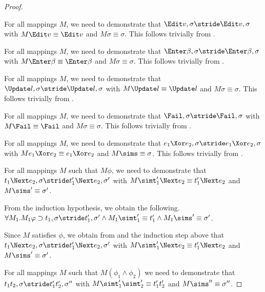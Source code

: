 \begin{proof}
{    }

  {For all mappings $M$, we need to demonstrate that
  $\Edit v,\sigma\stride \Edit v,\sigma$ with $M\Edit v \equiv \Edit v$ and $M\sigma \equiv \sigma$.
  This follows trivially from .

  }

  {For all mappings $M$, we need to demonstrate that $\Enter\beta,\sigma\stride\Enter\beta,\sigma$ with
  $M\Enter \beta \equiv \Enter \beta$ and $M\sigma \equiv {\sigma}$.
  This follows trivially from .
  }

  {For all mappings $M$, we need to demonstrate that $\Update l,\sigma\stride\Update l,\sigma$ with
  $M\Update l \equiv \Update l$ and $M\sigma \equiv {\sigma}$.
  This follows trivially from .
  }

  {For all mappings $M$, we need to demonstrate that $\Fail,\sigma\stride\Fail,\sigma$
  with
  $M\Fail \equiv \Fail$ and $M\sigma \equiv {\sigma}$.
  This follows trivially from .
  }

  {For all mappings $M$, we need to demonstrate that $e_1\Xor e_2,\sigma\stride e_1\Xor e_2,\sigma$ with
  $M e_1\Xor e_2 \equiv e_1\Xor e_2$ and $M\sims \equiv {\sigma}$.
  This follows trivially from .
  }

  {For all mappings $M$ such that $M\phi$,
  we need to demonstrate that
  $t_1\Next e_2,\sigma\stride t_1'\Next e_2,\sigma'$ with
  $M \simt_1'\Next e_2\equiv {t_1'}\Next e_2$ and $M \sims'\equiv{\sigma'}$.

  From the induction hypothesis, we obtain the following.
  $\forall M_1 . M_1 \phi \implies t_1,\sigma {\stride} {t_1'},{\sigma'}\land M_1 \simt_1'\equiv{t_1'}\land M_1\sims' \equiv{\sigma'}$.

  Since $M$ satisfies $\phi$, we obtain from  and the induction step above that $t_1\Next e_2,\sigma\stride t_1'\Next e_2,\sigma'$ with
  $M \simt_1'\Next e_2\equiv {t_1'}\Next e_2$ and $M \sims'\equiv{\sigma'}$.

  }

  {For all mappings $M$ such that $M(\phi_1\land \phi_2)$
  we need to demonstrate that $t_1\And t_2,\sigma\stride t_1'\And t_2',\sigma''$ with
  $M \simt_1'\And \simt_2'\equiv {t_1'}\And{t_2'}$ and $M\sims''\equiv {\sigma''}$.

}
\end{proof}
